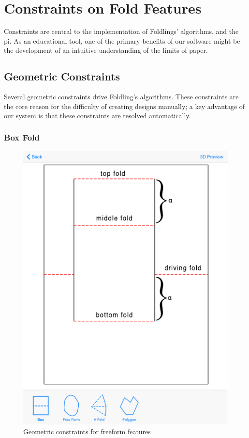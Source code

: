 \section{Constraints on Fold
Features}\label{constraints-on-fold-features}

Constraints are central to the implementation of Foldlings' algorithms,
and the pi. As an educational tool, one of the primary benefits of our
software might be the development of an intuitive understanding of the
limits of paper.

\subsection{Geometric Constraints}\label{geometric-constraints}

Several geometric constraints drive Foldling's algorithms. These
constraints are the core reason for the difficulty of creating designs
manually; a key advantage of our system is that these constraints are
resolved automatically.

\subsubsection{Box Fold}\label{box-fold}

\begin{figure}[htbp]
\centering
\includegraphics{figures/45_Tech_Constraints/boxfoldConstraints.pdf}
\caption{Geometric constraints for freeform features}
\end{figure}

